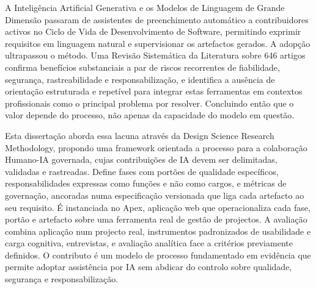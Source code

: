 \acresetall
\noindent A Inteligência Artificial Generativa e os Modelos de Linguagem de Grande Dimensão passaram de assistentes de preenchimento automático a contribuidores activos no Ciclo de Vida de Desenvolvimento de Software, permitindo exprimir requisitos em linguagem natural e supervisionar os artefactos gerados. A adopção ultrapassou o método. Uma Revisão Sistemática da Literatura sobre 646 artigos confirma benefícios substanciais a par de riscos recorrentes de fiabilidade, segurança, rastreabilidade e responsabilização, e identifica a ausência de orientação estruturada e repetível para integrar estas ferramentas em contextos profissionais como o principal problema por resolver. Concluindo então que o valor depende do processo, não apenas da capacidade do modelo em questão.

Esta dissertação aborda essa lacuna através da Design Science Research Methodology, propondo uma framework orientada a processo para a colaboração Humano-IA governada, cujas contribuições de IA devem ser delimitadas, validadas e rastreadas. Define fases com portões de qualidade específicos, responsabilidades expressas como funções e não como cargos, e métricas de governação, ancoradas numa especificação versionada que liga cada artefacto ao seu requisito. É instanciada no Apex, aplicação web que operacionaliza cada fase, portão e artefacto sobre uma ferramenta real de gestão de projectos. A avaliação combina aplicação num projecto real, instrumentos padronizados de usabilidade e carga cognitiva, entrevistas, e avaliação analítica face a critérios previamente definidos. O contributo é um modelo de processo fundamentado em evidência que permite adoptar assistência por IA sem abdicar do controlo sobre qualidade, segurança e responsabilização.
